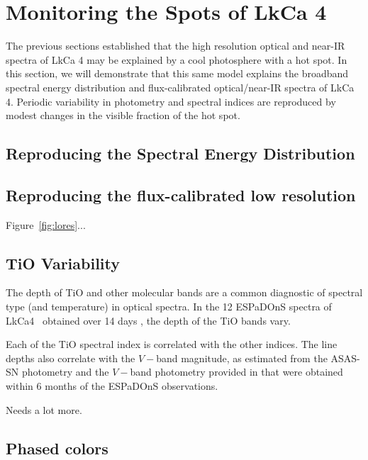 \documentclass[onecolumn]{emulateapj}%
\newcommand{\name}{LkCa4 }
\begin{document}
\section{Monitoring the Spots of LkCa 4}

The previous sections established that the high resolution optical and near-IR spectra of LkCa 4 may be explained by a cool photosphere with a hot spot.  In this section, we will demonstrate that this same model explains the broadband spectral energy distribution and flux-calibrated optical/near-IR spectra of LkCa 4.  Periodic variability in photometry and spectral indices are reproduced by modest changes in the visible fraction of the hot spot.

\subsection{Reproducing the Spectral Energy Distribution}




\subsection{Reproducing the flux-calibrated low resolution}

Figure~\ref{fig:lores}...




\subsection{TiO Variability}

The depth of TiO and other molecular bands are a common diagnostic of spectral type (and temperature) in optical spectra.  In the 12 ESPaDOnS spectra of \name\ obtained over 14 days \citep{2014MNRAS.444.3220D}, the depth of the TiO bands vary.  


Each of the TiO spectral index is correlated with the other indices.  The line depths also correlate with the $V-$band magnitude, as estimated from the ASAS-SN photometry and the $V-$band photometry provided in \citep{2014MNRAS.444.3220D} that were obtained within 6 months of the ESPaDOnS observations.  

Needs a lot more.





\subsection{Phased colors}
\end{document}

